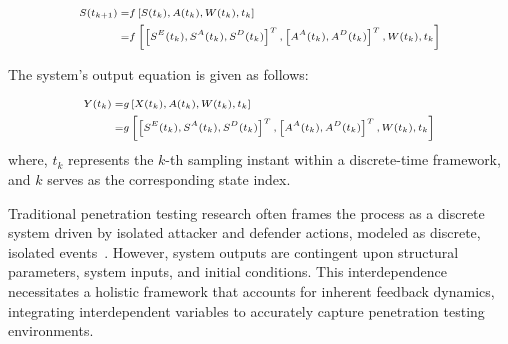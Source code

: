 \begin{equation}
\scriptsize
    \begin{aligned}
        S(t_{k+1})
        =&f\left [S(t_k),A(t_k),W(t_k),t_k\right ]\\
        =&f\left [\left [S^E(t_k),S^A(t_k),S^D(t_k)\right]^T,\left [A^A(t_k),A^D(t_k)\right]^T,W(t_k),t_k\right] \nonumber
    \end{aligned}
\end{equation}

The system's output equation is given as follows:

\begin{equation}
\scriptsize
    \begin{aligned}
        Y(t_{k})
        =&g\left [X(t_k),A(t_k),W(t_k),t_k\right ]\\
        =&g\left [\left [S^E(t_k),S^A(t_k),S^D(t_k)\right]^T,\left [A^A(t_k),A^D(t_k)\right]^T,W(t_k),t_k\right] \nonumber
    \end{aligned}
\end{equation}
where, $t_k$ represents the $k$-th sampling instant within a discrete-time framework, and $k$ serves as the corresponding state index.

Traditional penetration testing research often frames the process as a discrete system driven by isolated attacker and defender actions, modeled as discrete, isolated events~\cite{applebaum2017analysis, miller2018automated, 2020Finding}. However, system outputs are contingent upon structural parameters, system inputs, and initial conditions. This interdependence necessitates a holistic framework that accounts for inherent feedback dynamics, integrating interdependent variables to accurately capture penetration testing environments.

